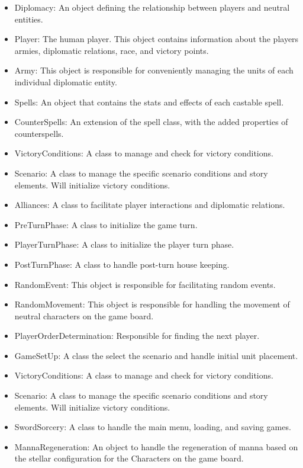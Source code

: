 \documentclass[12pt,a4paper]{article}
\begin{document}
\begin{itemize}
\item Diplomacy: An object defining the relationship between players and neutral entities.
\item Player: The human player. This object contains information about the players armies, diplomatic relations, race, and victory points.
\item Army: This object is responsible for conveniently managing the units of each individual diplomatic entity.
\item Spells: An object that contains the stats and effects of each castable spell.
\item CounterSpells: An extension of the spell class, with the added properties of counterspells.
\item VictoryConditions: A class to manage and check for victory conditions. 
\item Scenario: A class to manage the specific scenario conditions and story elements. Will initialize victory conditions.
\item Alliances: A class to facilitate player interactions and diplomatic relations.
\item PreTurnPhase: A class to initialize the game turn.
\item PlayerTurnPhase: A class to initialize the player turn phase.
\item PostTurnPhase: A class to handle post-turn house keeping.
\item RandomEvent: This object is responsible for facilitating random events.
\item RandomMovement: This object is responsible for handling the movement of neutral characters on the game board.
\item PlayerOrderDetermination: Responsible for finding the next player.
\item GameSetUp: A class the select the scenario and handle initial unit placement.
\item VictoryConditions: A class to manage and check for victory conditions. 
\item Scenario: A class to manage the specific scenario conditions and story elements. Will initialize victory conditions.
\item SwordSorcery: A class to handle the main menu, loading, and saving games.
\item MannaRegeneration: An object to handle the regeneration of manna based on the stellar configuration for the Characters on the game board. 


\end{itemize}
\end{document}
